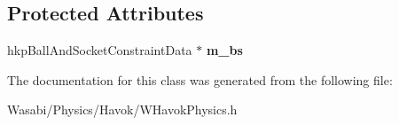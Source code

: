 \subsection*{Protected Attributes}
\begin{DoxyCompactItemize}
\item 
hkp\+Ball\+And\+Socket\+Constraint\+Data $\ast$ {\bfseries m\+\_\+bs}\hypertarget{class_w_ball_and_socket_abb12b132ddd343d089d6dfe06739270b}{}\label{class_w_ball_and_socket_abb12b132ddd343d089d6dfe06739270b}

\end{DoxyCompactItemize}


The documentation for this class was generated from the following file\+:\begin{DoxyCompactItemize}
\item 
Wasabi/\+Physics/\+Havok/W\+Havok\+Physics.\+h\end{DoxyCompactItemize}
